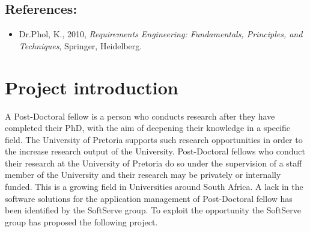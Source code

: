 \documentclass[12pt]{article}
\begin{document}
\vspace{0.2in}

\subsection{References:}
\vspace{0.1in}
\begin{itemize}
\item Dr.Phol, K., 2010, \textit{Requirements Engineering: Fundamentals, Principles, and Techniques}, Springer, Heidelberg.
\end{itemize}	

\vspace{0.5in}

\newpage
\section{Project introduction}
A Post-Doctoral fellow is a person who conducts research after they have completed their PhD, with the aim of deepening their knowledge in a specific field. The University of Pretoria supports such research opportunities in order to the increase research output of the University. Post-Doctoral fellows who conduct their research at the University of Pretoria do so under the supervision of a staff member of the University and their research may be privately or internally funded. This is a growing field in Universities around South Africa. A lack in the software solutions for the application management of Post-Doctoral fellow has been identified by the SoftServe group. To exploit the opportunity the SoftServe group has proposed the following project.
 
\vspace{0.2in}
\end{document}
